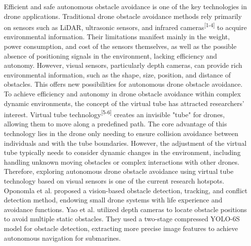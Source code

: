 \documentclass{aas}
\begin{document}

\cnaddress{}


\maketitle
Efficient and safe autonomous obstacle avoidance is one of the key technologies in drone applications. Traditional drone obstacle avoidance methods rely primarily on sensors such as LiDAR, ultrasonic sensors, and infrared cameras\textsuperscript{[1-4]} to acquire environmental information. Their limitations manifest mainly in the weight, power consumption, and cost of the sensors themselves, as well as the possible absence of positioning signals in the environment, lacking efficiency and autonomy. However, visual sensors, particularly depth cameras, can provide rich environmental information, such as the shape, size, position, and distance of obstacles. This offers new possibilities for autonomous drone obstacle avoidance. To achieve efficiency and autonomy in drone obstacle avoidance within complex dynamic environments, the concept of the virtual tube has attracted researchers' interest. Virtual tube technology\textsuperscript{[5-6]} creates an invisible "tube" for drones, allowing them to move along a predefined path. The core advantage of this technology lies in the drone only needing to ensure collision avoidance between individuals and with the tube boundaries. However, the adjustment of the virtual tube typically needs to consider dynamic changes in the environment, including handling unknown moving obstacles or complex interactions with other drones. Therefore, exploring autonomous drone obstacle avoidance using virtual tube technology based on visual sensors is one of the current research hotspots. Oponomla et al. proposed a vision-based obstacle detection, tracking, and conflict detection method, endowing small drone systems with life experience and avoidance functions. Yao et al. utilized depth cameras to locate obstacle positions to avoid multiple static obstacles. They used a two-stage compressed YOLO-6S model for obstacle detection, extracting more precise image features to achieve autonomous navigation for submarines.
\end{document}
